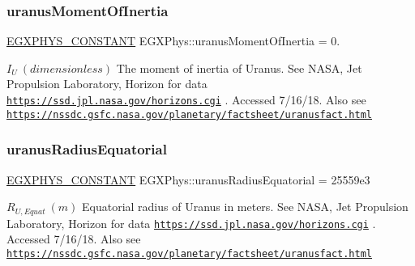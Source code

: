 \subsubsection{\texorpdfstring{uranus\+Moment\+Of\+Inertia}{uranusMomentOfInertia}}
{\footnotesize\ttfamily \mbox{\hyperlink{group___e_g_x_phys-_constants-_macros_ga76980d288494ce1714c9ac68a95ba702}{E\+G\+X\+P\+H\+Y\+S\+\_\+\+C\+O\+N\+S\+T\+A\+NT}} E\+G\+X\+Phys\+::uranus\+Moment\+Of\+Inertia = 0.}

$ I_{U} \ (dimensionless)$ The moment of inertia of Uranus. See N\+A\+SA, Jet Propulsion Laboratory, Horizon for data \href{https://ssd.jpl.nasa.gov/horizons.cgi}{\tt https\+://ssd.\+jpl.\+nasa.\+gov/horizons.\+cgi} . Accessed 7/16/18. Also see \href{https://nssdc.gsfc.nasa.gov/planetary/factsheet/uranusfact.html}{\tt https\+://nssdc.\+gsfc.\+nasa.\+gov/planetary/factsheet/uranusfact.\+html} \mbox{\label{group___e_g_x_phys-_constants-_astrophysics-_solar_system-_uranus-_bulk_ga8610758fe64ac622528c0b951dd90e23}} 
\subsubsection{\texorpdfstring{uranus\+Radius\+Equatorial}{uranusRadiusEquatorial}}
{\footnotesize\ttfamily \mbox{\hyperlink{group___e_g_x_phys-_constants-_macros_ga76980d288494ce1714c9ac68a95ba702}{E\+G\+X\+P\+H\+Y\+S\+\_\+\+C\+O\+N\+S\+T\+A\+NT}} E\+G\+X\+Phys\+::uranus\+Radius\+Equatorial = 25559e3}

$R_{U,Equat} \ (m)$ Equatorial radius of Uranus in meters. See N\+A\+SA, Jet Propulsion Laboratory, Horizon for data \href{https://ssd.jpl.nasa.gov/horizons.cgi}{\tt https\+://ssd.\+jpl.\+nasa.\+gov/horizons.\+cgi} . Accessed 7/16/18. Also see \href{https://nssdc.gsfc.nasa.gov/planetary/factsheet/uranusfact.html}{\tt https\+://nssdc.\+gsfc.\+nasa.\+gov/planetary/factsheet/uranusfact.\+html} \mbox{\label{group___e_g_x_phys-_constants-_astrophysics-_solar_system-_uranus-_bulk_ga91b85385fee1afe5a4df54e4b4cbe7ad}} 
